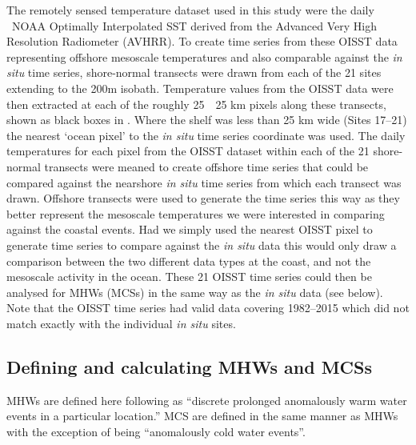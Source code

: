 \documentclass[a4paper,10pt,review]{elsarticle}
\begin{document}
The remotely sensed temperature dataset used in this study were the daily \degree~NOAA Optimally Interpolated SST \citep[OISST;][]{Reynolds2007} derived from the Advanced Very High Resolution Radiometer (AVHRR). To create time series from these OISST data representing offshore mesoscale temperatures and also comparable against the \emph{in situ} time series, shore-normal transects were drawn from each of the 21 sites extending to the 200m isobath. Temperature values from the OISST data were then extracted at each of the roughly 25~\texttimes~25 km pixels along these transects, shown as black boxes in . Where the shelf was less than 25 km wide (Sites 17--21) the nearest `ocean pixel' to the \emph{in situ} time series coordinate was used. The daily temperatures for each pixel from the OISST dataset within each of the 21 shore-normal transects were meaned to create offshore time series that could be compared against the nearshore \emph{in situ} time series from which each transect was drawn. Offshore transects were used to generate the time series this way as they better represent the mesoscale temperatures we were interested in comparing against the coastal events. Had we simply used the nearest OISST pixel to generate time series to compare against the \emph{in situ} data this would only draw a comparison between the two different data types at the coast, and not the mesoscale activity in the ocean. These 21 OISST time series could then be analysed for MHWs (MCSs) in the same way as the \emph{in situ} data (see below). Note that the OISST time series had valid data covering 1982--2015 which did not match exactly with the individual \emph{in situ} sites.

\subsection{Defining and calculating MHWs and MCSs}
MHWs are defined here following \citet{Hobday2016} as ``discrete prolonged anomalously warm water events in a particular location.'' MCS are defined in the same manner as MHWs with the exception of being ``anomalously cold water events''.
\end{document}
